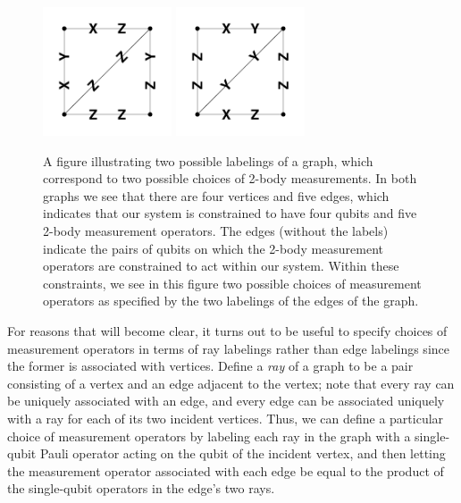 \documentclass[12pt]{amsbook}
\theoremstyle{plain}
\theoremstyle{definition}
\theoremstyle{remark}
\begin{document}
\begin{figure}
\begin{center}
\includegraphics[width=1.5in]{images/2labelings-1}
\includegraphics[width=1.5in]{images/2labelings-2}
\end{center}
\caption{
\label{figure:2labelings}
A figure illustrating two possible labelings of a graph, which correspond to two possible choices of 2-body measurements.  In both graphs we see that there are four vertices and five edges, which indicates that our system is constrained to have four qubits and five 2-body measurement operators.  The edges (without the labels) indicate the pairs of qubits on which the 2-body measurement operators are constrained to act within our system.  Within these constraints, we see in this figure two possible choices of measurement operators as specified by the two labelings of the edges of the graph.
}
\end{figure}

For reasons that will become clear, it turns out to be useful to specify choices of measurement operators in terms of ray labelings rather than edge labelings since the former is associated with vertices.  Define a \emph{ray} of a graph to be a pair consisting of a vertex and an edge adjacent to the vertex;  note that every ray can be uniquely associated with an edge, and every edge can be associated uniquely with a ray for each of its two incident vertices.  Thus, we can define a particular choice of measurement operators by labeling each ray in the graph with a single-qubit Pauli operator acting on the qubit of the incident vertex, and then letting the measurement operator associated with each edge be equal to the product of the single-qubit operators in the edge's two rays.
\end{document}
